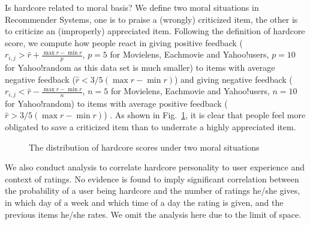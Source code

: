 \documentclass[sigconf]{acmart}
\begin{document}
Is hardcore related to moral basis? We define two moral situations in Recommender Systems, one is to praise a (wrongly) criticized item, the other is to criticize an (improperly) appreciated item. Following the definition of hardcore score, we compute how people react in giving positive feedback ($r_{i,j}>\hat{r}+\frac{\max{r}-\min{r}}{p}$, $p=5$ for Movielens, Eachmovie and Yahoo!users, $p=10$ for Yahoo!random as this data set is much smaller) to items with average negative feedback ($\hat{r}< 3/5 (\max{r}-\min{r})$) and giving negative feedback ($r_{i,j}<\hat{r}-\frac{\max{r}-\min{r}}{n}$, $n=5$ for Movielens, Eachmovie and Yahoo!users, $n=10$ for Yahoo!random) to items with average positive feedback ($\hat{r}>3/5 (\max{r}-\min{r})$) . As shown in Fig.~\ref{fig:moralbasis}, it is clear that people feel more obligated to save a criticized item than to underrate a highly appreciated item.

\begin{figure}[htbp]
\centering
\centering
{}
\caption{The distribution of hardcore scores under two moral situations}
\label{fig:moralbasis}
\end{figure}

We also conduct analysis to correlate hardcore personality to user experience and context of ratings. No evidence is found to imply significant correlation between the probability of a user being hardcore and the number of ratings he/she gives, in which day of a week and which time of a day the rating is given, and the previous items he/she rates. We omit the analysis here due to the limit of space.
\end{document}
